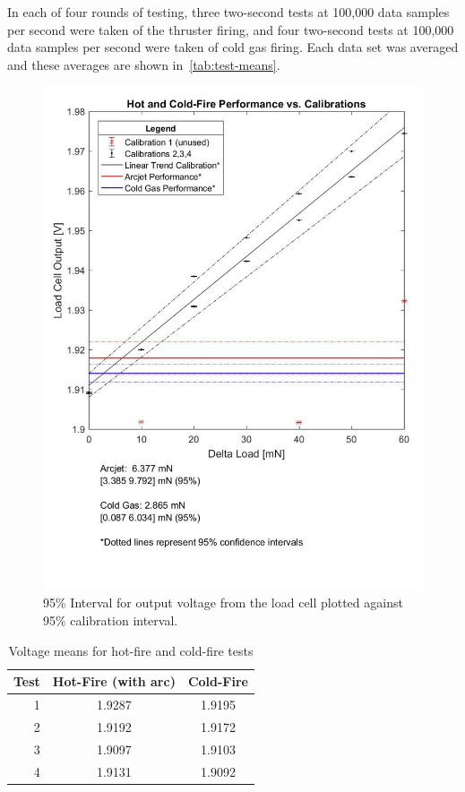 \documentclass[conference]{IEEEtran}
\begin{document}
In each of four rounds of testing, three two-second tests at 100,000 data samples per second were taken of the thruster firing, and four two-second tests at 100,000 data samples per second were taken of cold gas firing.
Each data set was averaged and these averages are shown in~\autoref{tab:test-means}.

\begin{figure}
  \includegraphics[width=\linewidth]{figs/thrust-data.jpg}
  \caption{95\% Interval for output voltage from the load cell plotted against 95\% calibration interval.}
\label{fig:curve}
\end{figure}

\begin{table}
  \centering
  \caption{Voltage means for hot-fire and cold-fire tests
\label{tab:test-means}}
  \begin{tabular}{rcc}
    \toprule
    Test & Hot-Fire (with arc) & Cold-Fire \\ \midrule
    1 & 1.9287 & 1.9195 \\
    2 & 1.9192 & 1.9172 \\
    3 & 1.9097 & 1.9103 \\
    4 & 1.9131 & 1.9092 \\
    \bottomrule
  \end{tabular}
\end{table}
\end{document}
